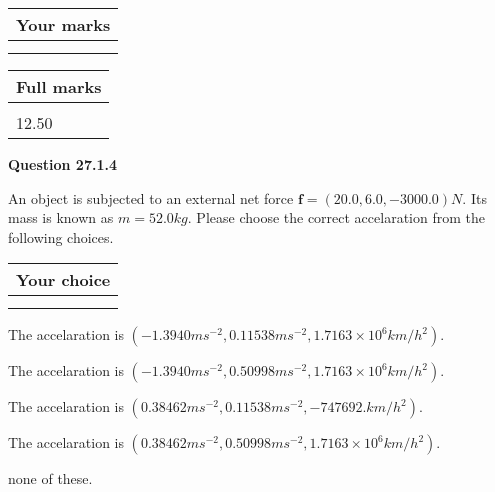\documentclass[12pt]{article}
\begin{document}
 
 
 

 
 
\vspace{0.3in}
  
\vspace{0.2in}
  
         \begin{tabular}{|l|}
\hline
 Your marks  \\
\hline
 \\ 
 \\ 
\hline
\end{tabular}
\hspace{0.05in} \begin{tabular}{|l|}
\hline
 Full marks  \\
\hline
 \\ 
12.50 \\
\hline
\end{tabular}
{\textbf{\Large{Question
27.1.4 
}}}
  
  
 
An object is subjected to an external net force $\mathbf{f}=(
20.0 ,
6.0,
-3000.0  )N$. Its mass is known as
$m= %
52.0  kg$. Please choose the correct accelaration
from the following choices.
 
  
  
\noindent\hspace{3.0in} \begin{tabular}{|l|}
\hline
Your choice \\
\hline
 \\ 
 \\ 
\hline
\end{tabular}
  
  
 
 
The accelaration is
$(
-1.3940ms^{-2},
0.11538ms^{-2},
1.7163 \times 10^{6}km/h^2
).
$
 
 
The accelaration is
$(
-1.3940ms^{-2},
0.50998ms^{-2},
1.7163 \times 10^{6}km/h^2
).
$
 
 
The accelaration is
$(
0.38462ms^{-2},
0.11538ms^{-2},
-747692.km/h^2
).
$
 
 
The accelaration is
$(
0.38462ms^{-2},
0.50998ms^{-2},
1.7163 \times 10^{6}km/h^2
).
$
 
 
none of these.
 
 
 
 
\end{document}
